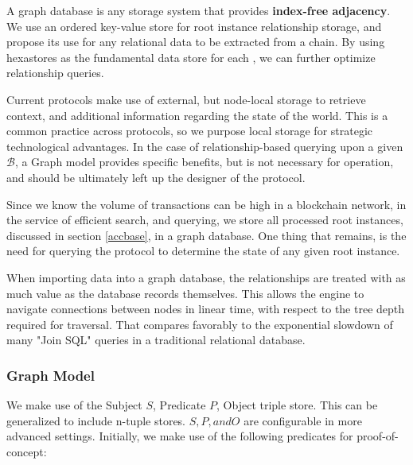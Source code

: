\documentclass[12pt, titlepage, twocolumn]{report}
\begin{document}
A graph database is any storage system that provides \textbf{index-free adjacency}. We use an ordered key-value store for root instance relationship storage, and propose its use for any relational data to be extracted from a chain. By using hexastores as the fundamental data store for each , we can further optimize relationship queries.

Current protocols make use of external, but node-local storage to retrieve context, and additional information regarding the state of the world. This is a common practice across protocols, so we purpose local storage for strategic technological advantages. In the case of relationship-based querying upon a given \(\boldsymbol{\mathcal{B}}\), a Graph model provides specific benefits, but is not necessary for operation, and should be ultimately left up the designer of the protocol.


Since we know the volume of transactions can be high in a blockchain network, in the service of efficient search, and querying, we store all processed root instances, discussed in section \ref{accbase}, in a graph database. One thing that remains, is the need for querying the protocol to determine the state of any given root instance. 

When importing data into a graph database, the relationships are treated with as much value as the database records themselves. This allows the engine to navigate connections between nodes in linear time, with respect to the tree depth required for traversal. That compares favorably to the exponential slowdown of many "Join SQL" queries in a traditional relational database.

\subsubsection{Graph Model}
We make use of the Subject \(S\), Predicate \(P\), Object triple store. This can be generalized to include n-tuple stores. \(S,P, and O\) are configurable in more advanced settings. Initially, we make use of the following predicates for proof-of-concept:
\end{document}

